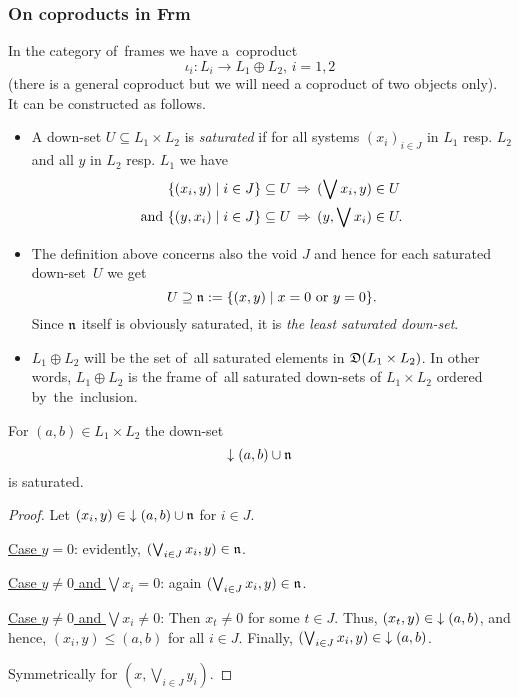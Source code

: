 \subsubsection*{On coproducts in Frm}

In the category of~frames we have a~coproduct
\[
  \iota_i: L_i \to L_1 \oplus L_2, \, i = 1, 2
\]
(there is a general coproduct but we will need a coproduct of two objects
 only).
It can be constructed as follows.

\begin{itemize}
\item
{} \label{df:satur}
A down-set $U\subseteq L_1 \times L_2$ is \emph{saturated\/} if for all systems
$(x_i)_{i\in J}$ in $L_1$ resp. $L_2$ and all $y$ in $L_2$ resp. $L_1$ we have
\begin{align*}
    \{ (x_i, y) \mid i\in J \} \subseteq U \, &\Rightarrow \, (\bigvee x_i,
        y)\in U \\
    \text{and } \{ (y, x_i) \mid i\in J \} \subseteq U \, &\Rightarrow \, (y,
        \bigvee x_i)\in U.
  \end{align*}

\item The definition above concerns also the void $J$ and hence for each
saturated down-set~$U$ we get
\[
  U\supseteq \mathfrak{n} := \{ (x, y) \mid x = 0 \text{ or } y = 0 \}.
\]
Since $\mathfrak{n}$ itself is obviously saturated, it is \emph{the least saturated
down-set\/}.

\item $L_1 \oplus L_2$ will be the set of~all saturated elements in $\mathfrak{D}(L_1
\times L_2)$.
In other words, $L_1 \oplus L_2$ is the frame of~all saturated down-sets of
$L_1 \times L_2$ ordered by~the~inclusion.
\end{itemize}

\begin{prop}
For $(a, b)\in L_1 \times L_2$ the down-set
\[
  \left\downarrow\right. (a, b) \cup \mathfrak{n}
\]
is saturated.
\end{prop}
\begin{proof}
  Let $(x_i, y)\in \left\downarrow\right. (a, b) \cup \mathfrak{n}$ for $i\in J$.

  \underline{Case $y = 0$}:
  evidently, $(\bigvee_{i\in J} x_i, y) \in \mathfrak{n}$.

  \underline{Case $y \ne 0$ and $\bigvee x_i = 0$}:
  again $(\bigvee_{i\in J} x_i, y) \in \mathfrak{n}$.

  \underline{Case $y \ne 0$ and $\bigvee x_i \ne 0$}:
  Then $x_t \ne 0$ for some $t\in J$.
  Thus, $(x_t, y)\in \left\downarrow\right. (a, b)$, and hence, $(x_i, y) \le (a, b)$ for all
  $i\in J$.
  Finally, $(\bigvee_{i\in J} x_i, y) \in \left\downarrow\right. (a, b)$.

  Symmetrically for $(x, \bigvee_{i\in J} y_i)$.
\end{proof}

